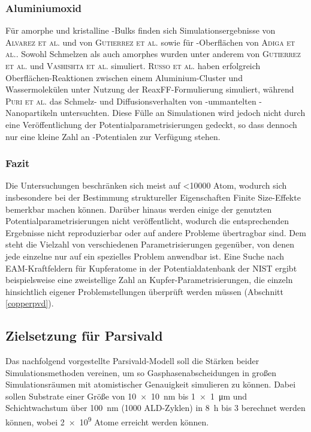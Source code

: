 \subsubsection{Aluminiumoxid}
Für amorphe und kristalline -Bulks finden sich Simulationsergebnisse von \textsc{Alvarez et al.}\cite{alvarez_computer_1995,alvarez_molecular_1992} und von \textsc{Gutierrez et al.}\cite{gutierrez_molecular_2002} sowie für -Oberflächen von \textsc{Adiga et al.}\cite{adiga_atomistic_2006}.
Sowohl Schmelzen als auch amorphes  wurden unter anderem von \textsc{Gutierrez et al.}\cite{gutierrez_structural_2000} und \textsc{Vashishta et al.}\cite{vashishta_interaction_2008} simuliert.
\textsc{Russo et al.}\cite{russo_molecular_2011} haben erfolgreich Oberflächen-Reaktionen zwischen einem Aluminium-Cluster und Wassermolekülen unter Nutzung der ReaxFF-Formulierung simuliert, während \textsc{Puri et al.}\cite{puri_thermo-mechanical_2010} das Schmelz- und Diffusionsverhalten von -ummantelten -Nanopartikeln untersuchten.
Diese Fülle an Simulationen wird jedoch nicht durch eine Veröffentlichung der Potentialparametrisierungen gedeckt, so dass dennoch nur eine kleine Zahl an -Potentialen zur Verfügung stehen.

\subsubsection{Fazit}
Die Untersuchungen beschränken sich meist auf \num{<10000} Atom, wodurch sich insbesondere bei der Bestimmung struktureller Eigenschaften Finite Size-Effekte bemerkbar machen können.
Darüber hinaus werden einige der genutzten Potentialparametrisierungen nicht veröffentlicht, wodurch die entsprechenden Ergebnisse nicht reproduzierbar oder auf andere Probleme übertragbar sind.
Dem steht die Vielzahl von verschiedenen Parametrisierungen gegenüber, von denen jede einzelne nur auf ein spezielles Problem anwendbar ist.
Eine Suche nach EAM-Kraftfeldern für Kupferatome in der Potentialdatenbank der NIST\cite{_interatomic_2014} ergibt beispielsweise eine zweistellige Zahl an Kupfer-Parametrisierungen, die einzeln hinsichtlich eigener Problemstellungen überprüft werden müssen (Abschnitt \ref{copperpvd}).

\subsection{Zielsetzung für Parsivald}

Das nachfolgend vorgestellte Parsivald-Modell soll die Stärken beider Simulationsmethoden vereinen, um so Gasphasenabscheidungen in großen Simulationsräumen mit atomistischer Genauigkeit simulieren zu können.
Dabei sollen Substrate einer Größe von \SI{10x10}{\nano\meter} bis \SI{1x1}{\micro\meter} und Schichtwachstum über \SI{100}{\nano\meter} (\num{1000} ALD-Zyklen) in \SI{8}{\hour} bis \SI{3}{\week} berechnet werden können, wobei \num{2e9} Atome erreicht werden können.
